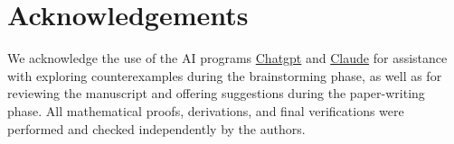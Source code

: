 \documentclass[11pt]{amsart}
\theoremstyle{theorem}
\theoremstyle{remark}
\theoremstyle{definition}
\begin{document}
\section*{Acknowledgements}
We acknowledge the use of the AI programs \href{https://chatgpt.com}{Chatgpt} and 
\href{https://claude.ai}{Claude}
for assistance with exploring counterexamples during the brainstorming phase, as well as for reviewing the manuscript and offering suggestions during the paper-writing phase. All mathematical proofs, derivations, and final verifications were performed and checked independently by the authors.



\end{document}
